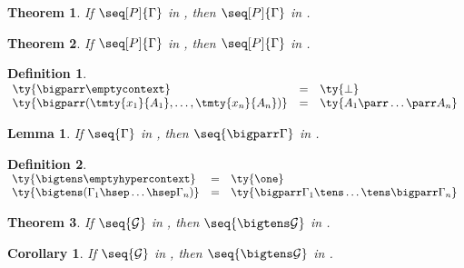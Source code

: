 \documentclass[submission,copyright,creativecommons]{eptcs}
\newtheorem{definition}{Definition}
\newtheorem{lemma}{Lemma}
\newtheorem{theorem}{Theorem}
\newtheorem{corollary}{Corollary}
\begin{document}
\begin{theorem}\label{thm:cp2hcp-typing}
  If $\seq[P]{\Gamma}$ in \cp, then $\seq[P]{\Gamma}$ in \hcp.
\end{theorem}
\begin{theorem}\label{thm:hcp2cp-typing}
  If $\seq[P]{\Gamma}$ in \hcp, then $\seq[P]{\Gamma}$ in \cp.
\end{theorem}
\begin{definition}\label{def:hcp-bigtens}
  \(\!%
  \begin{array}{lcl}
    \ty{\bigparr\emptycontext}
    & = & \ty{\bot}
    \\
    \ty{\bigparr(\tmty{x_1}{A_1}, \dots, \tmty{x_n}{A_n})}
    & = & \ty{A_1 \parr \dots \parr A_n}
  \end{array}
  \)
\end{definition}
\begin{lemma}\label{lem:hcp-bigparr}
  If $\seq{\Gamma}$ in \hcp, then $\seq{\bigparr\Gamma}$ in \hcp.
\end{lemma}
\begin{definition}\label{def:hcp-bigtens}
  \(\!%
  \begin{array}{lcl}
    \ty{\bigtens\emptyhypercontext}
    & = & \ty{\one}
    \\
    \ty{\bigtens(\Gamma_1 \hsep \dots \hsep \Gamma_n)}
    & = & \ty{\bigparr\Gamma_1 \tens \dots \tens \bigparr\Gamma_n}
  \end{array}
  \)
\end{definition}
\begin{theorem}\label{thm:hcp-bigtens}
  If $\seq{\mathcal{G}}$ in \hcp, then $\seq{\bigtens\mathcal{G}}$ in \hcp.
\end{theorem}
\begin{corollary}\label{cor:hcp-bigtens}
  If $\seq{\mathcal{G}}$ in \hcp, then $\seq{\bigtens\mathcal{G}}$ in \cp.
\end{corollary}
\end{document}
